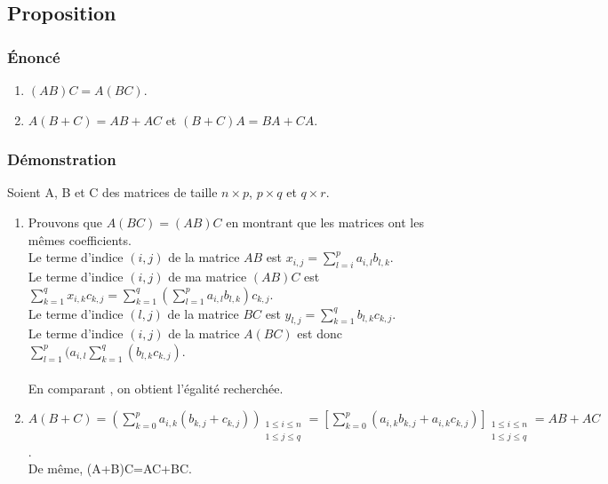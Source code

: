 \documentclass[a4paper,10pt]{book} %
\begin{document}
\subsection{Proposition}
\subsubsection{Énoncé}
\begin{enumerate} \item $(AB)C=A(BC)$.
\item $A(B+C)=AB+AC$ et $(B+C)A=BA+CA$. \end{enumerate}

\subsubsection{Démonstration}
Soient A, B et C des matrices de taille $n\times p$, $p\times q$ et $q\times r$.\\

\begin{enumerate} \item Prouvons que $A(BC)=(AB)C$ en montrant que les matrices ont les mêmes coefficients.\\

Le terme d'indice $(i,j)$ de la matrice $AB$ est $x_{i,j}=\sum\limits_{l=i}^{p}a_{i,l}b_{l,k}$.\\
Le terme d'indice $(i,j)$ de ma matrice $(AB)C$ est $\sum\limits_{k=1}^{q}x_{i,k}c_{k,j}=\sum\limits_{k=1}^{q}(\sum\limits_{l=1}^{p}a_{i,l}b_{l,k})c_{k,j}$.\\
Le terme d'indice $(l,j)$ de la matrice $BC$ est $y_{l,j}=\sum\limits_{k=1}^{q}b_{l,k}c_{k,j}$.\\
Le terme d'indice $(i,j)$ de la matrice $A(BC)$ est donc $\sum\limits_{l=1}^{p}(a_{i,l}\sum\limits_{k=1}^{q}(b_{l,k}c_{k,j})$.\\\\

En comparant , on obtient l'égalité recherchée.\\

\item $A(B+C)=(\sum\limits_{k=0}^p a_{i,k}(b_{k,j}+c_{k,j}))_{\substack{1\leq i\leq n\\ 1\leq j\leq q}}= \left[\sum\limits_{k=0}^p (a_{i,k}b_{k,j}+a_{i,k}c_{k,j})\right]_{\substack{1\leq i\leq n\\ 1\leq j\leq q}}= AB+AC$.\\

De même, (A+B)C=AC+BC.

\end{enumerate}
\end{document}
